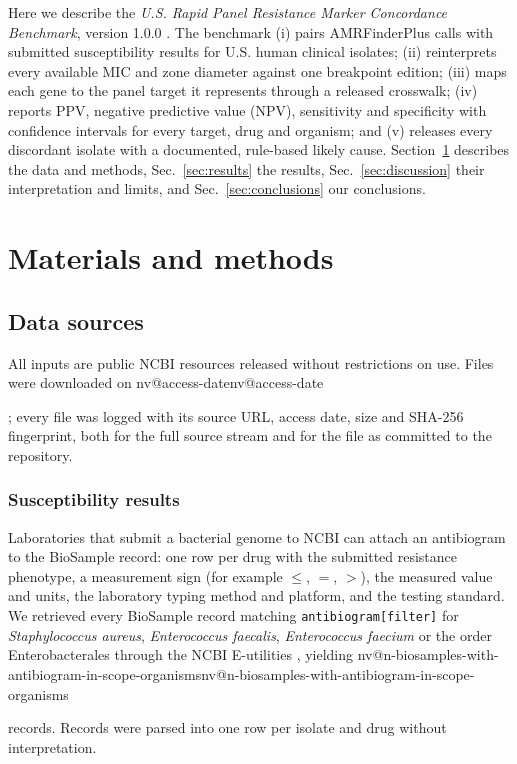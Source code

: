 \documentclass[10pt,twocolumn,letterpaper]{article}
\makeatletter
\newcommand{\nv}[1]{\ifcsname nv@#1\endcsname\csname nv@#1\endcsname\else
  \PackageError{numbers}{Unknown number key: #1}{Run build_assets.py}\fi}
\makeatother
\begin{document}
Here we describe the \emph{U.S. Rapid Panel Resistance Marker Concordance Benchmark}, version 1.0.0 \cite{thiswork}. The
benchmark (i) pairs AMRFinderPlus calls with submitted susceptibility results for U.S. human clinical isolates; (ii)
reinterprets every available MIC and zone diameter against one breakpoint edition; (iii) maps each gene to the panel target
it represents through a released crosswalk; (iv) reports PPV, negative predictive value (NPV), sensitivity and specificity
with confidence intervals for every target, drug and organism; and (v) releases every discordant isolate with a documented,
rule-based likely cause. Section~\ref{sec:methods} describes the data and methods, Sec.~\ref{sec:results} the results,
Sec.~\ref{sec:discussion} their interpretation and limits, and Sec.~\ref{sec:conclusions} our conclusions.

\section{Materials and methods}\label{sec:methods}

\subsection{Data sources}

All inputs are public NCBI resources released without restrictions on use. Files were downloaded on \nv{access-date};
every file was logged with its source URL, access date, size and SHA-256 fingerprint, both for the full source stream and
for the file as committed to the repository.

\subsubsection{Susceptibility results}
Laboratories that submit a bacterial genome to NCBI can attach an antibiogram to the BioSample record: one row per drug
with the submitted resistance phenotype, a measurement sign (for example $\le$, $=$, $>$), the measured value and units,
the laboratory typing method and platform, and the testing standard. We retrieved every BioSample record matching
\texttt{antibiogram[filter]} for \textit{Staphylococcus aureus}, \textit{Enterococcus faecalis}, \textit{Enterococcus
faecium} or the order Enterobacterales through the NCBI E-utilities \cite{eutils}, yielding
\nv{n-biosamples-with-antibiogram-in-scope-organisms} records. Records were parsed into one row per isolate and drug
without interpretation.
\end{document}
